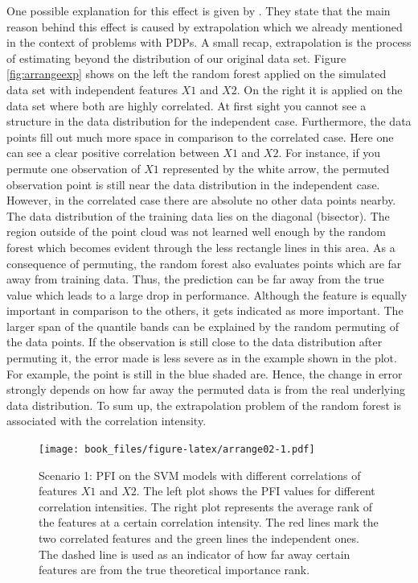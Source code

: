 \documentclass[]{krantz}
\begin{document}
One possible explanation for this effect is given by \citet{hooker2019}.
They state that the main reason behind this effect is caused by
extrapolation which we already mentioned in the context of problems with
PDPs. A small recap, extrapolation is the process of estimating beyond
the distribution of our original data set. Figure \ref{fig:arrangeexp}
shows on the left the random forest applied on the simulated data set
with independent features \(X1\) and \(X2\). On the right it is applied
on the data set where both are highly correlated. At first sight you
cannot see a structure in the data distribution for the independent
case. Furthermore, the data points fill out much more space in
comparison to the correlated case. Here one can see a clear positive
correlation between \(X1\) and \(X2\). For instance, if you permute one
observation of \(X1\) represented by the white arrow, the permuted
observation point is still near the data distribution in the independent
case. However, in the correlated case there are absolute no other data
points nearby. The data distribution of the training data lies on the
diagonal (bisector). The region outside of the point cloud was not
learned well enough by the random forest which becomes evident through
the less rectangle lines in this area. As a consequence of permuting,
the random forest also evaluates points which are far away from training
data. Thus, the prediction can be far away from the true value which
leads to a large drop in performance. Although the feature is equally
important in comparison to the others, it gets indicated as more
important. The larger span of the quantile bands can be explained by the
random permuting of the data points. If the observation is still close
to the data distribution after permuting it, the error made is less
severe as in the example shown in the plot. For example, the point is
still in the blue shaded are. Hence, the change in error strongly
depends on how far away the permuted data is from the real underlying
data distribution. To sum up, the extrapolation problem of the random
forest is associated with the correlation intensity.

\begin{figure}
\centering
\texttt{[image: book\_files/figure-latex/arrange02-1.pdf]}
\caption{\label{fig:arrange02}Scenario 1: PFI on the SVM models with
different correlations of features \(X1\) and \(X2\). The left plot
shows the PFI values for different correlation intensities. The right
plot represents the average rank of the features at a certain
correlation intensity. The red lines mark the two correlated features
and the green lines the independent ones. The dashed line is used as an
indicator of how far away certain features are from the true theoretical
importance rank.}
\end{figure}
\end{document}
